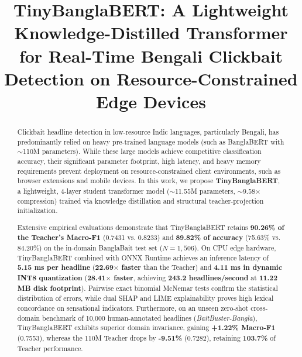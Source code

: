 \documentclass[conference]{IEEEtran}
\begin{document}
\title{TinyBanglaBERT: A Lightweight Knowledge-Distilled Transformer for Real-Time Bengali Clickbait Detection on Resource-Constrained Edge Devices}

\author{
}

\maketitle

\begin{abstract}
Clickbait headline detection in low-resource Indic languages, particularly Bengali, has predominantly relied on heavy pre-trained language models (such as BanglaBERT with $\sim$110M parameters). While these large models achieve competitive classification accuracy, their significant parameter footprint, high latency, and heavy memory requirements prevent deployment on resource-constrained client environments, such as browser extensions and mobile devices. In this work, we propose \textbf{TinyBanglaBERT}, a lightweight, 4-layer student transformer model ($\sim$11.55M parameters, $\sim$9.58$\times$ compression) trained via knowledge distillation and structural teacher-projection initialization. 

Extensive empirical evaluations demonstrate that TinyBanglaBERT retains \textbf{90.26\% of the Teacher's Macro-F1} (0.7431 vs. 0.8233) and \textbf{89.82\% of accuracy} (75.63\% vs. 84.20\%) on the in-domain BanglaBait test set ($N = 1,506$). On CPU edge hardware, TinyBanglaBERT combined with ONNX Runtime achieves an inference latency of \textbf{5.15 ms per headline} (\textbf{22.69$\times$ faster} than the Teacher) and \textbf{4.11 ms in dynamic INT8 quantization} (\textbf{28.41$\times$ faster}, achieving \textbf{243.2 headlines/second} at \textbf{11.22 MB disk footprint}). Pairwise exact binomial McNemar tests confirm the statistical distribution of errors, while dual SHAP and LIME explainability proves high lexical concordance on sensational indicators. Furthermore, on an unseen zero-shot cross-domain benchmark of 10,000 human-annotated headlines (\textit{BaitBuster-Bangla}), TinyBanglaBERT exhibits superior domain invariance, gaining \textbf{+1.22\% Macro-F1} (0.7553), whereas the 110M Teacher drops by \textbf{-9.51\%} (0.7282), retaining \textbf{103.7\%} of Teacher performance.
\end{abstract}
\end{document}

